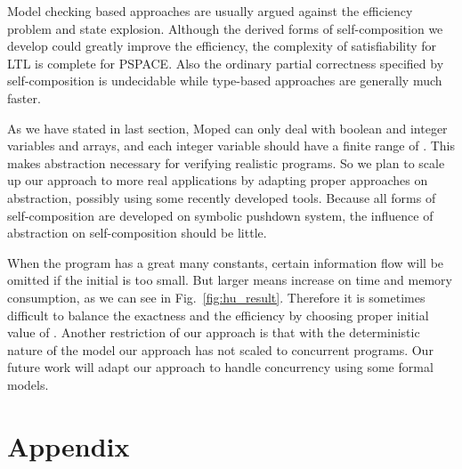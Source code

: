 \documentclass{llncs}
\begin{document}
Model checking based approaches are usually argued against the
efficiency problem and state explosion. Although the derived forms
of self-composition we develop could greatly improve the efficiency,
the complexity of satisfiability for LTL is complete for
PSPACE\cite{DBLP:journals/jacm/SistlaC85}\cite{DBLP:conf/banff/Vardi95}.
Also the ordinary partial correctness specified by self-composition
is undecidable while type-based approaches are generally much
faster.

As we have stated in last section, Moped can only deal with boolean
and integer variables and arrays, and each integer variable should
have a finite range of . This makes abstraction
necessary for verifying realistic programs. So we plan to scale up
our approach to more real applications by adapting proper approaches
on abstraction, possibly using some recently developed
tools\cite{DBLP:conf/tacas/SuwimonteerabuthSE05}\cite{DBLP:conf/cav/SuwimonteerabuthBSE07}.
Because all forms of self-composition are developed on symbolic
pushdown system, the influence of abstraction on self-composition
should be little.

When the program has a great many constants, certain information
flow will be omitted if the initial  is too small. But larger 
means increase on time and memory consumption, as we can see in
Fig.~\ref{fig:hu_result}. Therefore it is sometimes difficult to
balance the exactness and the efficiency by choosing proper initial
value of . Another restriction of our approach is that with the
deterministic nature of the model our approach has not scaled to
concurrent programs. Our future work will adapt our approach to
handle concurrency using some formal
models\cite{DBLP:conf/popl/BouajjaniET03}\cite{DBLP:conf/fsttcs/BouajjaniESS05}.

\nocite{mcps:mcbook}



\section*{Appendix}
\end{document}
